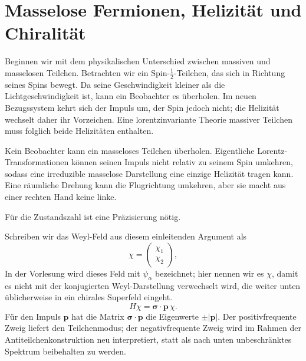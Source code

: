 \section{Masselose Fermionen, Helizität und Chiralität}

Beginnen wir mit dem physikalischen Unterschied zwischen massiven und masselosen Teilchen. Betrachten wir ein Spin-\(\tfrac12\)-Teilchen, das sich in Richtung seines Spins bewegt. Da seine Geschwindigkeit kleiner als die Lichtgeschwindigkeit ist, kann ein Beobachter es überholen. Im neuen Bezugssystem kehrt sich der Impuls um, der Spin jedoch nicht; die Helizität wechselt daher ihr Vorzeichen. Eine lorentzinvariante Theorie massiver Teilchen muss folglich beide Helizitäten enthalten.

Kein Beobachter kann ein masseloses Teilchen überholen. Eigentliche Lorentz-Transformationen können seinen Impuls nicht relativ zu seinem Spin umkehren, sodass eine irreduzible masselose Darstellung eine einzige Helizität tragen kann. Eine räumliche Drehung kann die Flugrichtung umkehren, aber sie macht aus einer rechten Hand keine linke.

\begin{classroomqa}
\end{classroomqa}

Für die Zustandszahl ist eine Präzisierung nötig.

Schreiben wir das Weyl-Feld aus diesem einleitenden Argument als
\begin{equation}
\chi=
\begin{pmatrix}
\chi_1\\
\chi_2
\end{pmatrix},
\end{equation}
In der Vorlesung wird dieses Feld mit \(\psi_\alpha\) bezeichnet; hier nennen wir es \(\chi\), damit es nicht mit der konjugierten Weyl-Darstellung verwechselt wird, die weiter unten üblicherweise in ein chirales Superfeld eingeht.
\begin{equation}
H\chi=\boldsymbol{\sigma}\cdot\mathbf p\,\chi.
\label{eq:l8-weyl-hamiltonian}
\end{equation}
Für den Impuls \(\mathbf p\) hat die Matrix \(\boldsymbol{\sigma}\cdot\mathbf p\) die Eigenwerte \(\pm|\mathbf p|\). Der positivfrequente Zweig liefert den Teilchenmodus; der negativfrequente Zweig wird im Rahmen der Antiteilchenkonstruktion neu interpretiert, statt als nach unten unbeschränktes Spektrum beibehalten zu werden.

